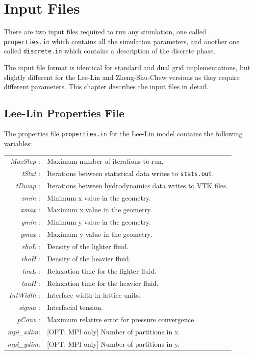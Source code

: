 \documentclass[12pt]{report}
\begin{document}
\chapter{Input Files}
There are two input files required to run any simulation, one called \verb+properties.in+ which contains all the simulation parameters, and another one called \verb+discrete.in+ which contains a description of the discrete phase.

The input file format is identical for standard and dual grid implementations, but slightly different for the Lee-Lin and Zheng-Shu-Chew versions as they require different parameters. This chapter describes the input files in detail.

\section{Lee-Lin Properties File}
The properties file \verb+properties.in+ for the Lee-Lin model contains the following variables:

\begin{longtable}{rl}
\textit{MaxStep}  :& Maximum number of iterations to run.\\
\textit{tStat}    :& Iterations between statistical data writes to \verb+stats.out+.\\
\textit{tDump}    :& Iterations between hydrodynamics data writes to VTK files.\\
\textit{xmin}     :& Minimum x value in the geometry.\\
\textit{xmax}     :& Maximum x value in the geometry.\\
\textit{ymin}     :& Minimum y value in the geometry.\\
\textit{ymax}     :& Maximum y value in the geometry.\\
\textit{rhoL}     :& Density of the lighter fluid.\\
\textit{rhoH}     :& Density of the heavier fluid.\\
\textit{tauL}     :& Relaxation time for the lighter fluid.\\
\textit{tauH}     :& Relaxation time for the heavier fluid.\\
\textit{IntWidth} :& Interface width in lattice units.\\
\textit{sigma}    :& Interfacial tension.\\
\textit{pConv}    :& Maximum relative error for pressure convergence.\\
\textit{mpi\_xdim}:& [OPT: MPI only] Number of partitions in x.\\
\textit{mpi\_ydim}:& [OPT: MPI only] Number of partitions in y.\\
\end{longtable}
\end{document}
